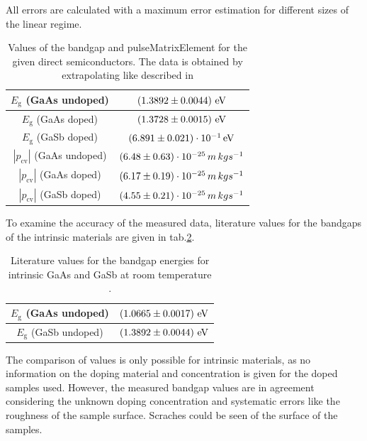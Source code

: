 All errors are calculated with a maximum error estimation for different sizes of the linear regime.
\begin{table}[h]
    \centering
    \begin{tabular}{c|c}
        \hline\hline
        $E_\text{g}$ (GaAs undoped) & $\left(1.3892 \pm 0.0044\right)\,\text{eV}$ \\ \hline
        $E_\text{g}$ (GaAs doped) & $\left(1.3728 \pm 0.0015\right)\,\text{eV}$   \\ \hline
        $E_\text{g}$ (GaSb doped) & $\left(6.891 \pm 0.021\right)\cdot 10^{-1}\,\text{eV}$   \\ \hline
        $|p_\text{cv}|$ (GaAs undoped) & $\left(6.48 \pm 0.63\right)\cdot 10^{-25}\,\text{$m\, kg s^{-1}$}$   \\ \hline
        $|p_\text{cv}|$ (GaAs doped) & $\left(6.17 \pm 0.19\right)\cdot 10^{-25}\,\text{$m\, kg s^{-1}$}$   \\ \hline
        $|p_\text{cv}|$ (GaSb doped) & $\left(4.55 \pm 0.21\right)\cdot 10^{-25}\,\text{$m\, kg s^{-1}$}$   \\ \hline\hline
    \end{tabular}
    \caption{Values of the bandgap and pulseMatrixElement for the given direct semiconductors.
    The data is obtained by extrapolating like described in \cite{Script}}
    \label{tab:directBandgapPulseMatrixElement}
\end{table}
To examine the accuracy of the measured data, literature values for the bandgaps 
of the intrinsic materials are given in tab.\ref{tab:literaturedirectBandgapPulseMatrixElement}.
\begin{table}[h]
    \centering
    \begin{tabular}{c|c}
        \hline\hline
        $E_\text{g}$ (GaAs undoped) & $\left(1.0665 \pm 0.0017\right)\,\text{eV}$ \\ \hline
        $E_\text{g}$ (GaSb undoped) & $\left(1.3892 \pm 0.0044\right)\,\text{eV}$   \\ \hline\hline
    \end{tabular}
    \caption{Literature values for the bandgap energies for intrinsic GaAs and GaSb at room temperature \cite{ioffe}.}
    \label{tab:literaturedirectBandgapPulseMatrixElement}
\end{table}
The comparison of values is only possible for intrinsic materials, 
as no information on the doping material and concentration is given for the doped samples used. 
However, the measured bandgap values are in agreement considering the unknown doping concentration and 
systematic errors like the roughness of the sample surface. Scraches could be seen of the surface of the samples.
